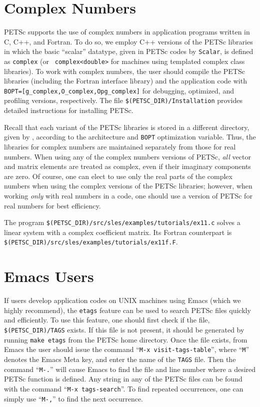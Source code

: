 \section{Complex Numbers}  \label{sec:complex}

PETSc supports the use of complex numbers in application programs
written in C, C++, and Fortran.  To do so, we employ C++ versions of
the PETSc libraries in which the basic ``scalar'' datatype, given in
PETSc codes by {\tt Scalar}, is defined as {\tt complex} (or {\tt
complex<double>} for machines using templated complex class
libraries).  To work with complex numbers,
the user should compile the PETSc libraries (including the Fortran
interface library) and the application code with
{\tt BOPT=[g\_complex,O\_complex,Opg\_complex]} for debugging, optimized,
and profiling versions, respectively.  The file {\tt \$(PETSC\_DIR)/Installation}
provides detailed instructions for installing PETSc.

Recall that each variant of the PETSc libraries is stored in a
different directory, given by
, according to the
architecture and {\tt BOPT} optimization variable.  Thus, the libraries for complex
numbers are maintained separately from those for real
numbers.  When using any of the complex numbers versions of PETSc,
{\em all} vector and matrix elements are treated as complex,
even if their imaginary components are zero.
Of course, one can elect to use only the real parts of the complex
numbers when using the complex versions of the PETSc libraries;
however, when working {\em only} with real numbers in a code,
one should use a version of PETSc for real numbers for best efficiency.

The program {\tt \$(PETSC\_DIR)/src/sles/examples/tutorials/ex11.c}
solves a linear system with a complex
coefficient matrix.  Its Fortran counterpart is
{\tt \$(PETSC\_DIR)/src/sles/examples/tutorials/ex11f.F}.

\section{Emacs Users}  \label{sec:emacs}

 
If users develop application codes on UNIX machines using Emacs (which we
highly recommend), the {\tt etags} feature can be used to search PETSc 
files quickly and efficiently.  To use this feature, one should 
first check if the file,
{\tt \$(PETSC\_DIR)/TAGS} exists.  If this file is
not present, it should be generated by
running {\tt make etags} from the PETSc home directory. 
Once the file exists, from 
Emacs the user should issue
the command ``{\tt M-x visit-tags-table}'', where ``{\tt M}''
denotes the Emacs Meta key, and enter the 
name of the {\tt TAGS} file. Then the command ``{\tt M-.}'' will cause Emacs 
to find the file and line number where a desired PETSc function 
is defined.  Any string in any of the PETSc files can be found with the 
command ``{\tt M-x tags-search}''. To find repeated occurrences, 
one can simply use ``{\tt M-,}'' to find the next occurrence.

